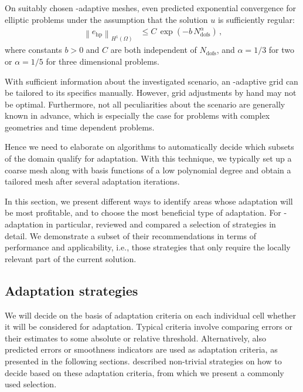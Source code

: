 On suitably chosen \hp-adaptive meshes, \textcites[Thm.~5.1]{guo1986}[Thm.~2.5.2, Thm.~3.5.1]{babuska1996} even predicted exponential convergence for elliptic problems under the assumption that the solution $u$ is sufficiently regular:
\begin{align}
\label{eq:errorbound_exp} \left\|e_\text{hp}\right\|_{H^{1}(\Omega)} &\leq C \, \exp\left(- b \, N_\text{dofs}^\alpha \right) \,\text{,}
\end{align}
where constants $b > 0$ and $C$ are both independent of $N_\text{dofs}$, and $\alpha = 1/3$ for two or $\alpha = 1/5$ for three dimensional problems.

With sufficient information about the investigated scenario, an \hp-adaptive grid can be tailored to its specifics manually. However, grid adjustments by hand may not be optimal. Furthermore, not all peculiarities about the scenario are generally known in advance, which is especially the case for problems with complex geometries and time dependent problems.

Hence we need to elaborate on algorithms to automatically decide which subsets of the domain qualify for adaptation. With this technique, we typically set up a coarse mesh along with basis functions of a low polynomial degree and obtain a tailored mesh after several adaptation iterations.

In this section, we present different ways to identify areas whose adaptation will be most profitable, and to choose the most beneficial type of adaptation. For \hp-adaptation in particular, \textcite{mitchell2014} reviewed and compared a selection of strategies in detail. We demonstrate a subset of their recommendations in terms of performance and applicability, i.e., those strategies that only require the locally relevant part of the current solution.



\subsection{Adaptation strategies}
\label{ssec:strategy}

We will decide on the basis of adaptation criteria on each individual cell whether it will be considered for adaptation. Typical criteria involve comparing errors or their estimates to some absolute or relative threshold. Alternatively, also predicted errors or smoothness indicators are used as adaptation criteria, as presented in the following sections. \textcite[Sec.~5.2]{bangerth2003} described non-trivial strategies on how to decide based on these adaptation criteria, from which we present a commonly used selection.

